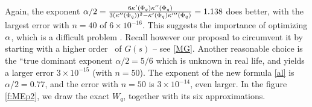 Again, the exponent  $\alpha/2=\frac{ 6 \kappa'(\Phi_{q}) \kappa''(\Phi_{q})}{3 (\kappa''(\Phi_{q}))^2- \kappa'(\Phi_{q}) \kappa'''(\Phi_{q})}=1.138$ does better,  with the largest error  with $n=40$ of $6 \times 10^{-16}$.  This suggests the importance of optimizing $\alpha$, which is a  difficult problem \cite{giunta1989more,weideman1999algorithms}.  Recall however our proposal  to circumvent it by starting with a
higher order \Pd \ of $G(s)$ -- see \eqref{MG}.
 Another reasonable choice is the ``true dominant exponent  $\alpha/2=5/6$ which is unknown in real life, and yields a larger error $3 \times  10^{-15}$ (with $n=50$). The exponent of the new  formula \eqref{al} is $\alpha/2=0.77$, and the  error with $n=50$ is $3 \times 10^{-14}$, even larger.
In  the figure \ref{f:MEp2}, we draw the exact $W_q$, together with its six   approximations.
\fi

